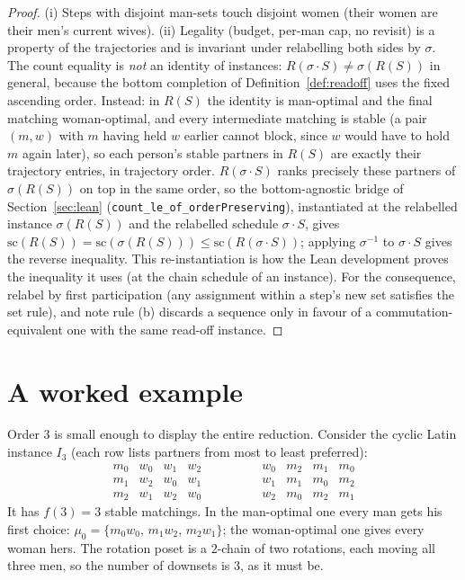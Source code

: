 \documentclass[11pt]{article}
\begin{document}
\begin{proof}
(i) Steps with disjoint man-sets touch disjoint women (their women are their men's current wives).
(ii) Legality (budget, per-man cap, no revisit) is a property of the trajectories and is invariant
under relabelling both sides by $\sigma$. The count equality is \emph{not} an identity of
instances: $R(\sigma\cdot S)\ne\sigma(R(S))$ in general, because the bottom completion of
Definition~\ref{def:readoff} uses the fixed ascending order. Instead: in $R(S)$ the identity is
man-optimal and the final matching woman-optimal, and every intermediate matching is stable (a pair
$(m,w)$ with $m$ having held $w$ earlier cannot block, since $w$ would have to hold $m$ again
later), so each person's stable partners in $R(S)$ are exactly their trajectory entries, in
trajectory order. $R(\sigma\cdot S)$ ranks precisely these partners of $\sigma(R(S))$ on top in the
same order, so the bottom-agnostic bridge of Section~\ref{sec:lean}
(\texttt{count\_le\_of\_orderPreserving}), instantiated at the relabelled instance
$\sigma(R(S))$ and the relabelled schedule $\sigma\cdot S$, gives
$\mathrm{sc}(R(S))=\mathrm{sc}(\sigma(R(S)))\le\mathrm{sc}(R(\sigma\cdot S))$; applying
$\sigma^{-1}$ to $\sigma\cdot S$ gives the reverse inequality. This re-instantiation is how the
Lean development proves the inequality it uses (at the chain schedule of an instance).
For the consequence, relabel by first participation (any assignment within a step's new set
satisfies the set rule), and note rule (b) discards a sequence only in favour of a
commutation-equivalent one with the same read-off instance.
\end{proof}


\section{A worked example}\label{sec:example}

Order $3$ is small enough to display the entire reduction. Consider the cyclic Latin
instance $I_3$ (each row lists partners from most to least preferred):
\[
\begin{array}{c|ccc}
m_0 & w_0 & w_1 & w_2\\
m_1 & w_2 & w_0 & w_1\\
m_2 & w_1 & w_2 & w_0
\end{array}
\qquad\qquad
\begin{array}{c|ccc}
w_0 & m_2 & m_1 & m_0\\
w_1 & m_1 & m_0 & m_2\\
w_2 & m_0 & m_2 & m_1
\end{array}
\]
It has $f(3)=3$ stable matchings. In the man-optimal one every man gets his first
choice: $\mu_0=\{m_0w_0,\,m_1w_2,\,m_2w_1\}$; the woman-optimal one gives every woman
hers. The rotation poset is a $2$-chain of two rotations, each moving all three men, so
the number of downsets is $3$, as it must be.
\end{document}
